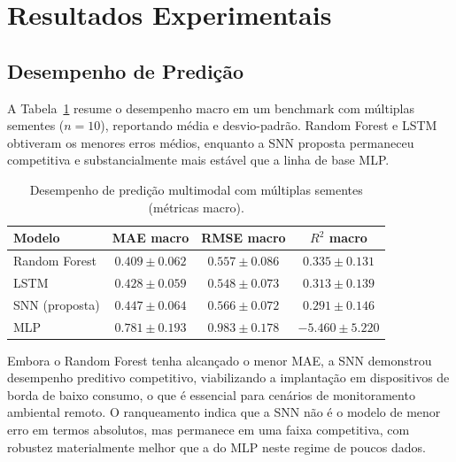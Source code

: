 \section{Resultados Experimentais}

\subsection{Desempenho de Predição}
A Tabela~\ref{tab:pred_perf} resume o desempenho macro em um benchmark com múltiplas sementes ($n=10$), reportando média e desvio-padrão. Random Forest e LSTM obtiveram os menores erros médios, enquanto a SNN proposta permaneceu competitiva e substancialmente mais estável que a linha de base MLP.

\begin{table}[!h]
\caption{Desempenho de predição multimodal com múltiplas sementes (métricas macro).}
\label{tab:pred_perf}
\centering
\footnotesize
\setlength{\tabcolsep}{3pt}
\begin{tabular}{lccc}
\toprule
Modelo & MAE macro & RMSE macro & $R^2$ macro \\
\midrule
Random Forest & $\mathbf{0.409 \pm 0.062}$ & $0.557 \pm 0.086$ & $\mathbf{0.335 \pm 0.131}$ \\
LSTM & $0.428 \pm 0.059$ & $\mathbf{0.548 \pm 0.073}$ & $0.313 \pm 0.139$ \\
SNN (proposta) & $0.447 \pm 0.064$ & $0.566 \pm 0.072$ & $0.291 \pm 0.146$ \\
MLP & $0.781 \pm 0.193$ & $0.983 \pm 0.178$ & $-5.460 \pm 5.220$ \\
\bottomrule
\end{tabular}
\end{table}

Embora o Random Forest tenha alcançado o menor MAE, a SNN demonstrou desempenho preditivo competitivo, viabilizando a implantação em dispositivos de borda de baixo consumo, o que é essencial para cenários de monitoramento ambiental remoto. O ranqueamento indica que a SNN não é o modelo de menor erro em termos absolutos, mas permanece em uma faixa competitiva, com robustez materialmente melhor que a do MLP neste regime de poucos dados.

{\sloppy{}\par}

